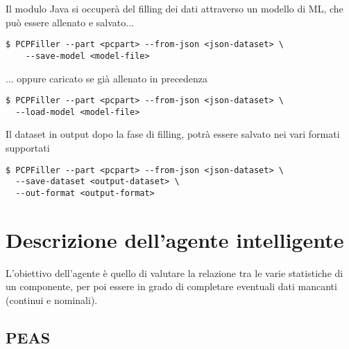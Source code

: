 \documentclass[12pt]{report}
\begin{document}
Il modulo Java si occuperà del filling dei dati attraverso un modello di ML, che può essere allenato e salvato...
\begin{verbatim}
$ PCPFiller --part <pcpart> --from-json <json-dataset> \
	--save-model <model-file>
\end{verbatim}

... oppure caricato se già allenato in precedenza
\begin{verbatim}
$ PCPFiller --part <pcpart> --from-json <json-dataset> \
  --load-model <model-file>
\end{verbatim}

Il dataset in output dopo la fase di filling, potrà essere salvato nei vari formati supportati
\begin{verbatim}
$ PCPFiller --part <pcpart> --from-json <json-dataset> \
  --save-dataset <output-dataset> \
  --out-format <output-format>
\end{verbatim}

\newpage
\section{Descrizione dell'agente intelligente}

L'obiettivo dell'agente è quello di valutare la relazione tra le varie statistiche di un componente,
per poi essere in grado di completare eventuali dati mancanti (continui e nominali).

\subsection{PEAS}
\end{document}
